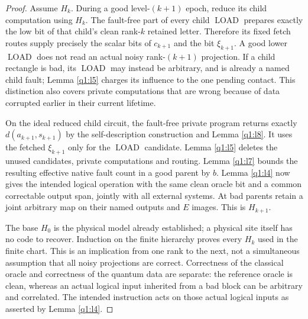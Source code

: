 \begin{proof}
Assume \(H_{k}\). During a good level-\((k+1)\) epoch, reduce its child computation using \(H_{k}\). The fault-free part of every child \(\operatorname{LOAD}\) prepares exactly the low bit of that child's clean rank-\(k\) retained letter. Therefore its fixed fetch routes supply precisely the scalar bits of \(c_{k+1}\) and the bit \(\xi_{k+1}\). A good lower \(\operatorname{LOAD}\) does not read an actual noisy rank-\((k+1)\) projection. If a child rectangle is bad, its \(\operatorname{LOAD}\) may instead be arbitrary, and is already a named child fault; Lemma \ref{q1:l5} charges its influence to the one pending contact. This distinction also covers private computations that are wrong because of data corrupted earlier in their current lifetime.

On the ideal reduced child circuit, the fault-free private program returns exactly \(d(a_{k+1},s_{k+1})\) by the self-description construction and Lemma \ref{q1:l8}. It uses the fetched \(\xi_{k+1}\) only for the \(\operatorname{LOAD}\) candidate. Lemma \ref{q1:l5} deletes the unused candidates, private computations and routing. Lemma \ref{q1:l7} bounds the resulting effective native fault count in a good parent by \(b\). Lemma \ref{q1:l4} now gives the intended logical operation with the same clean oracle bit and a common correctable output span, jointly with all external systems. At bad parents retain a joint arbitrary map on their named outputs and \(E\) images. This is \(H_{k+1}\).

The base \(H_{0}\) is the physical model already established; a physical site itself has no code to recover. Induction on the finite hierarchy proves every \(H_{k}\) used in the finite chart. This is an implication from one rank to the next, not a simultaneous assumption that all noisy projections are correct. Correctness of the classical oracle and correctness of the quantum data are separate: the reference oracle is clean, whereas an actual logical input inherited from a bad block can be arbitrary and correlated. The intended instruction acts on those actual logical inputs as asserted by Lemma \ref{q1:l4}. 
\end{proof}



